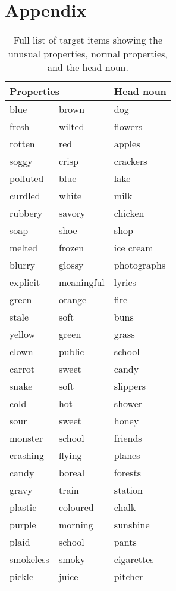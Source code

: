 \documentclass[output=paper]{langsci/langscibook}
\begin{document}
\clearpage
\section*{Appendix}

\begin{table}
  \caption{Full list of target items showing the unusual properties,
    normal properties, and the head noun.}
  \label{tab:}

  \begin{tabular}{lll}

    \multicolumn{2}{l}{Properties} & Head noun \\ \hline
    
    blue & brown & dog\\
    fresh & wilted & flowers\\
    rotten & red & apples\\
    soggy & crisp & crackers\\
    polluted & blue & lake\\
    curdled & white & milk\\
    rubbery & savory & chicken\\
    soap & shoe & shop\\
    melted & frozen & ice cream\\
    blurry & glossy & photographs\\
    explicit & meaningful & lyrics\\
    green & orange & fire\\
    stale & soft & buns\\
    yellow & green & grass\\
    clown & public & school\\
    carrot & sweet & candy\\
    snake & soft & slippers\\
    cold & hot & shower\\
    sour & sweet & honey\\
    monster & school & friends\\
    crashing & flying & planes\\
    candy & boreal & forests\\
    gravy & train & station\\
    plastic & coloured & chalk\\
    purple & morning & sunshine\\
    plaid & school & pants\\
    smokeless & smoky & cigarettes\\
    pickle & juice & pitcher\\
    
  \end{tabular}
\end{table}
\end{document}
